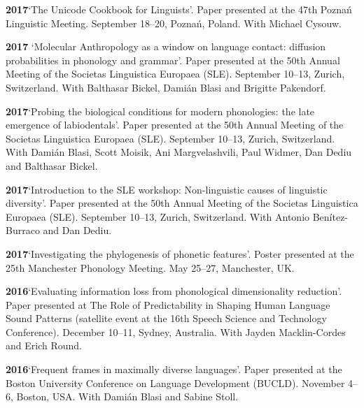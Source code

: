 \documentclass[11pt]{article}
\newcommand{\hangpara}{
 \setlength{\parindent}{0in} %
 \hangindent=0.42in %
}
\begin{document}
\vskip 6pt
\hangpara
{\bf 2017}\hspace{1ex}`The Unicode Cookbook for Linguists'. Paper presented at the 47th Pozna{\'n} Linguistic Meeting. September 18--20, Pozna{\'n}, Poland. With Michael Cysouw. 

\vskip 6pt
\hangpara
{\bf 2017}\hspace{1ex} `Molecular Anthropology as a window on language contact: diffusion probabilities in phonology and grammar'. Paper presented at the 50th Annual Meeting of the Societas Linguistica Europaea (SLE). September 10--13, Zurich, Switzerland. With Balthasar Bickel, Dami{\'a}n Blasi and Brigitte Pakendorf.
 
\vskip 6pt
\hangpara
{\bf 2017}\hspace{1ex}`Probing the biological conditions for modern phonologies: the late emergence of labiodentals'. Paper presented at the 50th Annual Meeting of the Societas Linguistica Europaea (SLE). September 10--13, Zurich, Switzerland. With Dami{\'a}n Blasi, Scott Moisik, Ani Margvelashvili, Paul Widmer, Dan Dediu and Balthasar Bickel.

\vskip 6pt
\hangpara
{\bf 2017}\hspace{1ex}`Introduction to the SLE workshop: Non-linguistic causes of linguistic diversity'. Paper presented at the 50th Annual Meeting of the Societas Linguistica Europaea (SLE). September 10--13, Zurich, Switzerland. With Antonio Benítez-Burraco and Dan Dediu.

\vskip 6pt
\hangpara
{\bf 2017}\hspace{1ex}`Investigating the phylogenesis of phonetic features'. Poster presented at the 25th Manchester Phonology Meeting. May 25--27, Manchester, UK.

\vskip 6pt
\hangpara
{\bf 2016}\hspace{1ex}`Evaluating information loss from phonological dimensionality reduction'. Paper presented at The Role of Predictability in Shaping Human Language Sound Patterns (satellite event at the 16th Speech Science and Technology Conference). December 10--11, Sydney, Australia. With Jayden Macklin-Cordes and Erich Round.

\vskip 6pt
\hangpara
{\bf 2016}\hspace{1ex}`Frequent frames in maximally diverse languages'. Paper presented at the Boston University Conference on Language Development (BUCLD). November 4--6, Boston, USA. With Dami{\'a}n Blasi and Sabine Stoll.
\end{document}
